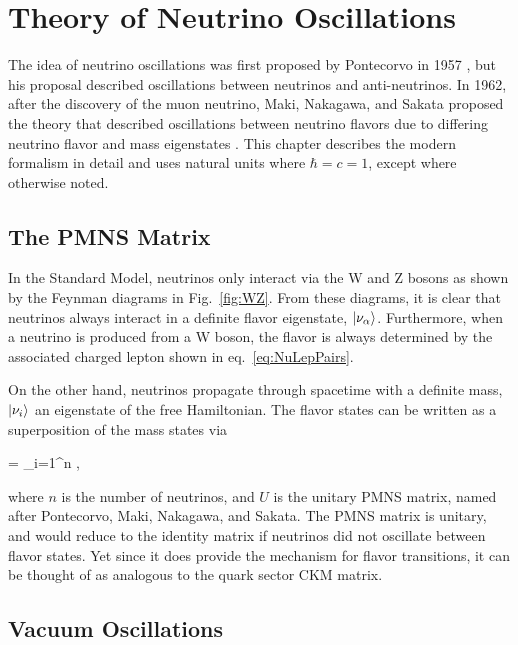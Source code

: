 \chapter{Theory of Neutrino Oscillations}
\label{ch:Theory}

The idea of neutrino oscillations was first proposed by Pontecorvo in 1957 \cite{ref:Pontecorvo1}, but his proposal described oscillations between neutrinos and anti-neutrinos. In 1962, after the discovery of the muon neutrino, Maki, Nakagawa, and Sakata proposed the theory that described oscillations between neutrino flavors due to differing neutrino flavor and mass eigenstates \cite{ref:MNS}. This chapter describes the modern formalism in detail and uses natural units where $\hbar = c = 1$, except where otherwise noted.

\section{The PMNS Matrix}
\label{sec:TheoryPMNS}

In the Standard Model, neutrinos only interact via the W and Z bosons as shown by the Feynman diagrams in Fig.~\ref{fig:WZ}. From these diagrams, it is clear that neutrinos always interact in a definite flavor eigenstate, $\ket{\nu_\alpha}$. Furthermore, when a neutrino is produced from a W boson, the flavor is always determined by the associated charged lepton shown in eq.~\ref{eq:NuLepPairs}.

\beqa
\nue \numu \nutau
\label{eq:NuLepPairs}
\eeqa

\n On the other hand, neutrinos propagate through spacetime with a definite mass, $\ket{\nu_i}$ an eigenstate of the free Hamiltonian. The flavor states can be written as a superposition of the mass states via

\beq
\ket{\nu_\alpha} = \sum_{i=1}^n  ,
\label{eq:massflav}
\eeq

\n where $n$ is the number of neutrinos, and $U$ is the unitary PMNS matrix, named after Pontecorvo, Maki, Nakagawa, and Sakata. The PMNS matrix is unitary, and would reduce to the identity matrix if neutrinos did not oscillate between flavor states. Yet since it does provide the mechanism for flavor transitions, it can be thought of as analogous to the quark sector CKM matrix.

\section{Vacuum Oscillations}

